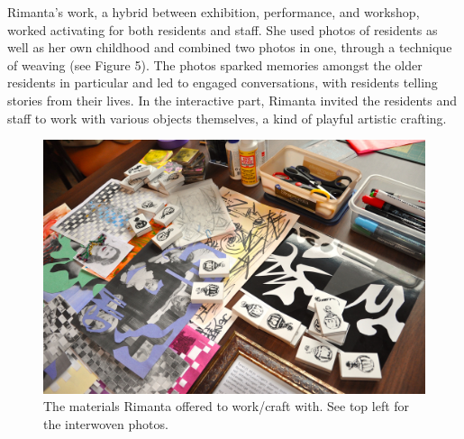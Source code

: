 \documentclass[authordate, empirical]{jote-new-article}
\begin{document}
	Rimanta's work, a hybrid between exhibition, performance, and workshop, worked activating for both residents and staff. She used photos of residents as well as her own childhood and combined two photos in one, through a technique of weaving (see Figure 5). The photos sparked memories amongst the older residents in particular and led to engaged conversations, with residents telling stories from their lives. In the interactive part, Rimanta invited the residents and staff to work with various objects themselves, a kind of playful artistic crafting.







	\begin{figure}
		\includegraphics[width=\linewidth]{media/fig+5.jpeg}

		\caption{The materials Rimanta offered to work/craft with. See top left for the interwoven photos.}



	\end{figure}
\end{document}
